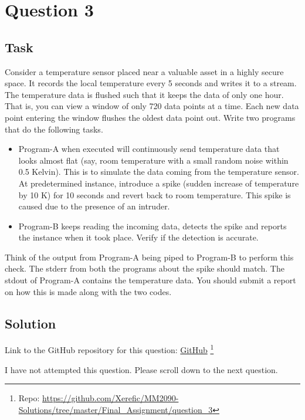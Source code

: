 \section{Question 3}

\subsection{Task}
Consider a temperature sensor placed near a valuable asset in a highly secure space. It records the local temperature every 5 seconds and writes it to a stream. The temperature data is flushed such that it keeps the data of only one hour. That is, you can view a window of only 720 data points at a time. Each new data point entering the window flushes the oldest data point out. Write two programs that do the following tasks.
\begin{itemize}
	\item Program-A when executed will continuously send temperature data that looks almost flat (say, room temperature with a small random noise within 0.5 Kelvin). This is to simulate the data coming from the temperature sensor. At predetermined instance, introduce a spike (sudden increase of temperature by 10 K) for 10 seconds and revert back to room temperature. This spike is caused due to the presence of an intruder.
	\item Program-B keeps reading the incoming data, detects the spike and reports the instance when it took place. Verify if the detection is accurate.
\end{itemize}
Think of the output from Program-A being piped to Program-B to perform this check. The stderr from both the programs about the spike should match. The stdout of Program-A contains the temperature data. You should submit a report on how this is made along with the two codes.

\subsection{Solution}

Link to the GitHub repository for this question: \href{https://github.com/Xerefic/MM2090-Solutions/tree/master/Final_Assignment/question_3}{GitHub} \footnote{Repo: \url{https://github.com/Xerefic/MM2090-Solutions/tree/master/Final_Assignment/question_3}}

I have not attempted this question. Please scroll down to the next question.